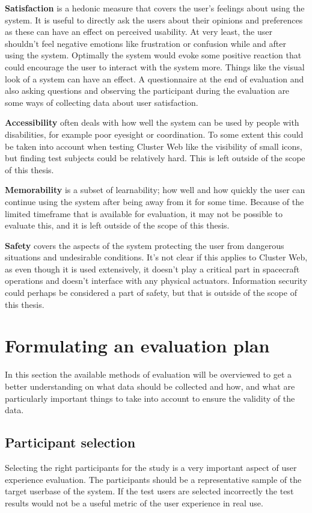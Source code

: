 \textbf{Satisfaction} is a hedonic measure that covers the user's feelings about using the system. It is useful to directly ask the users about their opinions and preferences as these can have an effect on perceived usability. At very least, the user shouldn't feel negative emotions like frustration or confusion while and after using the system. Optimally the system would evoke some positive reaction that could encourage the user to interact with the system more. Things like the visual look of a system can have an effect. A questionnaire at the end of evaluation and also asking questions and observing the participant during the evaluation are some ways of collecting data about user satisfaction.

\textbf{Accessibility} often deals with how well the system can be used by people with disabilities, for example poor eyesight or coordination. To some extent this could be taken into account when testing Cluster Web like the visibility of small icons, but finding test subjects could be relatively hard. This is left outside of the scope of this thesis.

\textbf{Memorability} is  a subset of learnability; how well and how quickly the user can continue using the system after being away from it for some time. Because of the limited timeframe that is available for evaluation, it may not be possible to evaluate this, and it is left outside of the scope of this thesis.

\textbf{Safety} covers the aspects of the system protecting the user from dangerous situations and undesirable conditions. It's not clear if this applies to Cluster Web, as even though it is used extensively, it doesn't play a critical part in spacecraft operations and doesn't interface with any physical actuators. Information security could perhaps be considered a part of safety, but that is outside of the scope of this thesis.

\cite{bevanevaluation, rubin2008handbook, albert2013measuring, laugwitz2008construction}

\section{Formulating an evaluation plan}
In this section the available methods of evaluation will be overviewed to get a better understanding on what data should be collected and how, and what are particularly important things to take into account to ensure the validity of the data.

\subsection{Participant selection}
Selecting the right participants for the study is a very important aspect of user experience evaluation. The participants should be a representative sample of the target userbase of the system. If the test users are selected incorrectly the test results would not be a useful metric of the user experience in real use.

